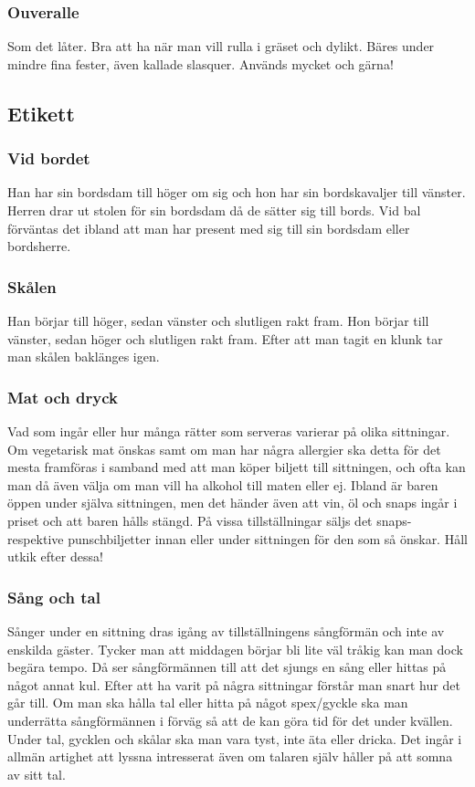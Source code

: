 \subsubsection{Ouveralle}
Som det låter. Bra att ha när man vill rulla i gräset och
dylikt. Bäres under mindre fina fester, även kallade
slasquer. Används mycket och gärna!

\newpage
\subsection{Etikett}

\subsubsection{Vid bordet}
Han har sin bordsdam till höger om sig och hon har sin
bordskavaljer till vänster. Herren drar ut stolen för sin
bordsdam då de sätter sig till bords. Vid bal förväntas det
ibland att man har present med sig till sin bordsdam eller
bordsherre.

\subsubsection{Skålen}
Han börjar till höger, sedan vänster och slutligen rakt
fram. Hon börjar till vänster, sedan höger och slutligen
rakt fram. Efter att man tagit en klunk tar man skålen
baklänges igen.

\subsubsection{Mat och dryck}
Vad som ingår eller hur många rätter som serveras
varierar på olika sittningar. Om vegetarisk mat önskas
samt om man har några allergier ska detta för det mesta
framföras i samband med att man köper biljett till
sittningen, och ofta kan man då även välja om man vill ha
alkohol till maten eller ej.
Ibland är baren öppen under själva sittningen, men det
händer även att vin, öl och snaps ingår i priset och att
baren hålls stängd. På vissa tillställningar säljs det snaps-
respektive punschbiljetter innan eller under sittningen för
den som så önskar. Håll utkik efter dessa!

\subsubsection{Sång och tal}
Sånger under en sittning dras igång av tillställningens
sångförmän och inte av enskilda gäster. Tycker man att
middagen börjar bli lite väl tråkig kan man dock begära
tempo. Då ser sångförmännen till att det sjungs en sång
eller hittas på något annat kul. Efter att ha varit på några
sittningar förstår man snart hur det går till. Om man ska
hålla tal eller hitta på något spex/gyckle ska man
underrätta sångförmännen i förväg så att de kan göra tid
för det under kvällen. Under tal, gycklen och skålar ska
man vara tyst, inte äta eller dricka. Det ingår i allmän
artighet att lyssna intresserat även om talaren själv håller
på att somna av sitt tal.


